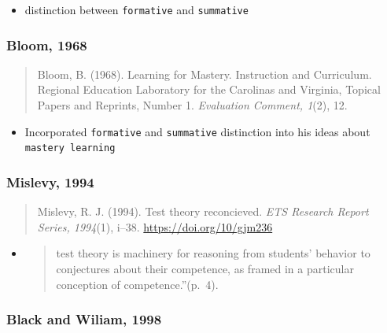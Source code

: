 \documentclass[
]{book}
\providecommand{\tightlist}{%
  \setlength{\itemsep}{0pt}\setlength{\parskip}{0pt}}
\begin{document}
\begin{itemize}
\tightlist
\item
  distinction between \texttt{formative} and \texttt{summative}
\end{itemize}

\hypertarget{bloom-1968}{%
\subsubsection*{Bloom, 1968}\label{bloom-1968}}

\begin{quote}
Bloom, B. (1968). Learning for Mastery. Instruction and Curriculum. Regional Education Laboratory for the Carolinas and Virginia, Topical Papers and Reprints, Number 1. \emph{Evaluation Comment, 1}(2), 12.
\end{quote}

\begin{itemize}
\tightlist
\item
  Incorporated \texttt{formative} and \texttt{summative} distinction into his ideas about \texttt{mastery\ learning}
\end{itemize}

\hypertarget{mislevy-1994}{%
\subsubsection*{Mislevy, 1994}\label{mislevy-1994}}

\begin{quote}
Mislevy, R. J. (1994). Test theory reconcieved. \emph{ETS Research Report Series, 1994}(1), i--38. \url{https://doi.org/10/gjm236}
\end{quote}

\begin{itemize}
\item
  \begin{quote}
  test theory is machinery for reasoning from students' behavior to conjectures about their competence, as framed in a particular conception of competence.''(p.~4).
  \end{quote}
\end{itemize}

\hypertarget{black-and-wiliam-1998}{%
\subsubsection*{Black and Wiliam, 1998}\label{black-and-wiliam-1998}}
\end{document}
